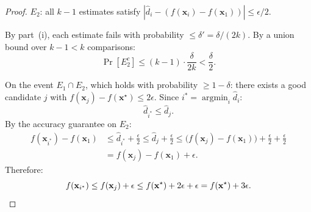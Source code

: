 \documentclass[12pt]{article}
\begin{document}
\begin{proof}
$E_2$: all $k-1$ estimates satisfy $|\hat{d}_i - (f(\mathbf{x}_i) - f(\mathbf{x}_1))| \leq \epsilon/2$.

By part~(i), each estimate fails with probability $\leq \delta' = \delta/(2k)$. By a union bound over $k-1 < k$ comparisons:
\[
\Pr[E_2^c] \leq (k-1) \cdot \frac{\delta}{2k} < \frac{\delta}{2}.
\]

On the event $E_1 \cap E_2$, which holds with probability $\geq 1 - \delta$:
there exists a good candidate $j$ with $f(\mathbf{x}_j) - f(\mathbf{x}^\star) \leq 2\epsilon$. Since $i^* = \operatorname{argmin}_i \hat{d}_i$:
\[
\hat{d}_{i^*} \leq \hat{d}_j.
\]
By the accuracy guarantee on $E_2$:
\begin{align*}
f(\mathbf{x}_{i^*}) - f(\mathbf{x}_1) &\leq \hat{d}_{i^*} + \frac{\epsilon}{2} \leq \hat{d}_j + \frac{\epsilon}{2} \leq \bigl(f(\mathbf{x}_j) - f(\mathbf{x}_1)\bigr) + \frac{\epsilon}{2} + \frac{\epsilon}{2} \\
&= f(\mathbf{x}_j) - f(\mathbf{x}_1) + \epsilon.
\end{align*}
Therefore:
\[
f(\mathbf{x}_{i^*}) \leq f(\mathbf{x}_j) + \epsilon \leq f(\mathbf{x}^\star) + 2\epsilon + \epsilon = f(\mathbf{x}^\star) + 3\epsilon. \qedhere
\]
\end{proof}
\end{document}
